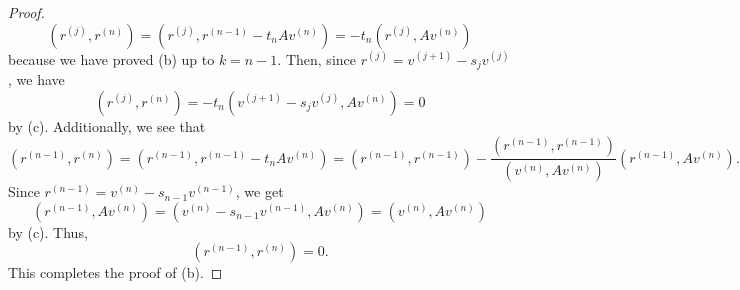 \documentclass{homework}
\newcommand{\pow}[1]{^{\left(#1\right)}}
\begin{document}
\begin{proof}
		\begin{equation*}
			\left(r\pow{j}, r\pow{n}\right) = \left(r\pow{j}, r\pow{n-1} - t_{n}Av\pow{n}\right) = -t_{n}\left(r\pow{j}, Av\pow{n}\right)
		\end{equation*}
		because we have proved (b) up to $k=n-1$. Then, since $r\pow{j} = v\pow{j+1} - s_jv\pow{j}$, we have
		\begin{equation*}
			\left(r\pow{j}, r\pow{n}\right) = -t_{n}\left(v\pow{j+1} - s_jv\pow{j}, Av\pow{n}\right) = 0
		\end{equation*}
		by (c). Additionally, we see that
		\begin{equation*}
			\left(r\pow{n-1}, r\pow{n}\right) = \left(r\pow{n-1}, r\pow{n-1}- t_{n}Av\pow{n}\right) = \left(r\pow{n-1}, r\pow{n-1}\right) - \frac{\left(r\pow{n-1}, r\pow{n-1}\right)}{\left(v\pow{n}, Av\pow{n}\right)}\left(r\pow{n-1}, Av\pow{n}\right).
		\end{equation*}
		Since $r\pow{n-1} = v\pow{n} - s_{n-1}v\pow{n-1}$, we get
		\begin{equation*}
			\left(r\pow{n-1}, Av\pow{n}\right) = \left(v\pow{n} - s_{n-1}v\pow{n-1}, Av\pow{n}\right) = \left(v\pow{n}, Av\pow{n}\right)
		\end{equation*}
		by (c). Thus,
		\begin{equation*}
			\left(r\pow{n-1}, r\pow{n}\right) = 0.
		\end{equation*}
		This completes the proof of (b).
	\end{proof}
	
\end{document}
